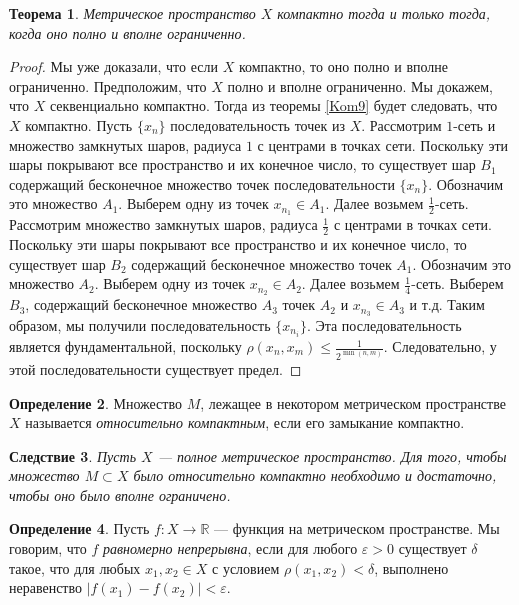 \documentclass[12pt, titlepage, oneside]{amsbook}
\newcommand{\RR}{\mathbb{R}}
\newtheorem{theorem}{Теорема}[chapter]
\newtheorem{corollary}[theorem]{Следствие}
\theoremstyle{definition}
\newtheorem{definition}[theorem]{Определение}
\theoremstyle{remark}
\begin{document}
\begin{theorem}
\label{Kom10}
Метрическое пространство $X$ компактно тогда и только тогда, когда оно полно и вполне ограниченно.
\end{theorem}

\begin{proof}
Мы уже доказали, что если $X$ компактно, то оно полно и вполне ограниченно. Предположим, что $X$ полно и вполне ограниченно. Мы докажем, что $X$ секвенциально компактно. Тогда из теоремы \ref{Kom9} будет следовать, что $X$ компактно. Пусть $\{x_n\}$ последовательность точек из $X$. Рассмотрим $1$-сеть и множество замкнутых шаров, радиуса $1$ с центрами в точках сети. Поскольку эти шары покрывают все пространство и их конечное число, то существует шар $B_1$ содержащий бесконечное множество точек последовательности $\{x_n\}$. Обозначим это множество $A_1$. Выберем одну из точек $x_{n_1}\in A_1$. Далее возьмем $\frac{1}{2}$-сеть. Рассмотрим множество замкнутых шаров, радиуса $\frac{1}{2}$ с центрами в точках сети. Поскольку эти шары покрывают все пространство и их конечное число, то существует шар $B_2$ содержащий бесконечное множество точек $A_1$. Обозначим это множество $A_2$. Выберем одну из точек $x_{n_2}\in A_2$. Далее возьмем $\frac{1}{4}$-сеть. Выберем $B_3$, содержащий бесконечное множество $A_3$ точек $A_2$ и $x_{n_3}\in A_3$ и т.д. Таким образом, мы получили последовательность $\{x_{n_i}\}$. Эта последовательность является фундаментальной, поскольку $\rho(x_n,x_m)\leq\frac{1}{2^{\min(n,m)}}$. Следовательно, у этой последовательности существует предел.
\end{proof}

\begin{definition}
Множество $M$, лежащее в некотором метрическом пространстве $X$ называется \emph{относительно компактным}, если его замыкание компактно.
\end{definition}

 \begin{corollary}
\label{Kom10-1}
Пусть $X$ --- полное метрическое пространство. Для того, чтобы множество $M\subset X$ было относительно компактно необходимо и достаточно, чтобы оно было вполне ограничено.
\end{corollary}


\begin{definition}
Пусть $f\colon X\rightarrow\RR$ --- функция на метрическом пространстве. Мы говорим, что $f$ \emph{равномерно непрерывна}, если для любого $\varepsilon>0$ существует $\delta$ такое, что для любых $x_1,x_2\in X$ с условием $\rho(x_1,x_2)<\delta$, выполнено неравенство $|f(x_1)-f(x_2)|<\varepsilon$.
\end{definition}
\end{document}
